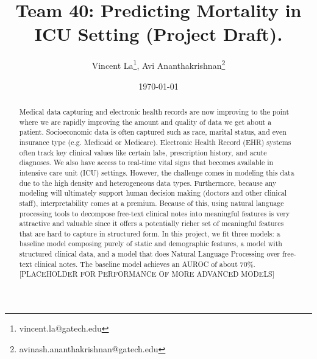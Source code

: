 \documentclass[12pt, final]{article}
\renewcommand{\thefootnote}{$\star$}
\begin{document}
\title{Team 40: Predicting Mortality in ICU Setting (Project Draft).}

\date{\today}

\renewcommand{\thefootnote}{$\dag$}
\author{Vincent La\footnote{vincent.la@gatech.edu}, Avi Ananthakrishnan\footnote{avinash.ananthakrishnan@gatech.edu}}

\maketitle

\begin{abstract}
Medical data capturing and electronic health records are now improving to the point where we are rapidly improving the amount and quality of data we get about a patient. Socioeconomic data is often captured such as race, marital status, and even insurance type (e.g. Medicaid or Medicare). Electronic Health Record (EHR) systems often track key clinical values like certain labs, prescription history, and acute diagnoses. We also have access to real-time vital signs that becomes available in intensive care unit (ICU) settings. However, the challenge comes in modeling this data due to the high density and heterogeneous data types. Furthermore, because any modeling will ultimately support human decision making (doctors and other clinical staff), interpretability comes at a premium. Because of this, using natural language processing tools to decompose free-text clinical notes into meaningful features is very attractive and valuable since it offers a potentially richer set of meaningful features that are hard to capture in structured form. In this project, we fit three models: a baseline model composing purely of static and demographic features, a model with structured clinical data, and a model that does Natural Language Processing over free-text clinical notes. The baseline model achieves an AUROC of about 70\%. [PLACEHOLDER FOR PERFORMANCE OF MORE ADVANCED MODELS]
\end{abstract} 

\newpage
\renewcommand{\thefootnote}{\number\value{footnote}} 
\end{document}

